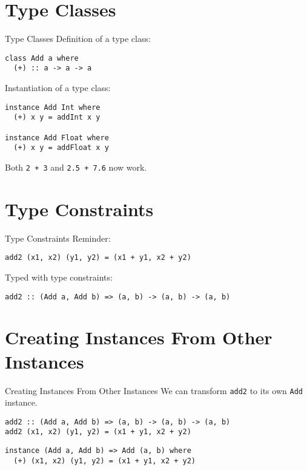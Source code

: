 \documentclass[
  english,            %
  aspectratio=169,    %
]{tumbeamer}
\begin{document}
\section{Type Classes}

\begin{frame}[fragile]{Type Classes}
Definition of a type class:
\begin{verbatim}
class Add a where
  (+) :: a -> a -> a
\end{verbatim}

\pause \vspace{3mm}

Instantiation of a type class:
\begin{verbatim}
instance Add Int where
  (+) x y = addInt x y

instance Add Float where
  (+) x y = addFloat x y
\end{verbatim}

\pause \vspace{3mm}

Both \texttt{2 + 3} and \texttt{2.5 + 7.6} now work.
\end{frame}

\section{Type Constraints}

\begin{frame}[fragile]{Type Constraints}
Reminder:
\begin{verbatim}
add2 (x1, x2) (y1, y2) = (x1 + y1, x2 + y2)
\end{verbatim}

\pause \vspace{3mm}

Typed with type constraints:
\begin{verbatim}
add2 :: (Add a, Add b) => (a, b) -> (a, b) -> (a, b)
\end{verbatim}
\end{frame}

\section{Creating Instances From Other Instances}

\begin{frame}[fragile]{Creating Instances From Other Instances}
We can transform \texttt{add2} to its own \texttt{Add} instance.
\begin{verbatim}
add2 :: (Add a, Add b) => (a, b) -> (a, b) -> (a, b)
add2 (x1, x2) (y1, y2) = (x1 + y1, x2 + y2)
\end{verbatim}

\pause \vspace{6mm}

\begin{verbatim}
instance (Add a, Add b) => Add (a, b) where
  (+) (x1, x2) (y1, y2) = (x1 + y1, x2 + y2)
\end{verbatim}
\end{frame}
\end{document}

